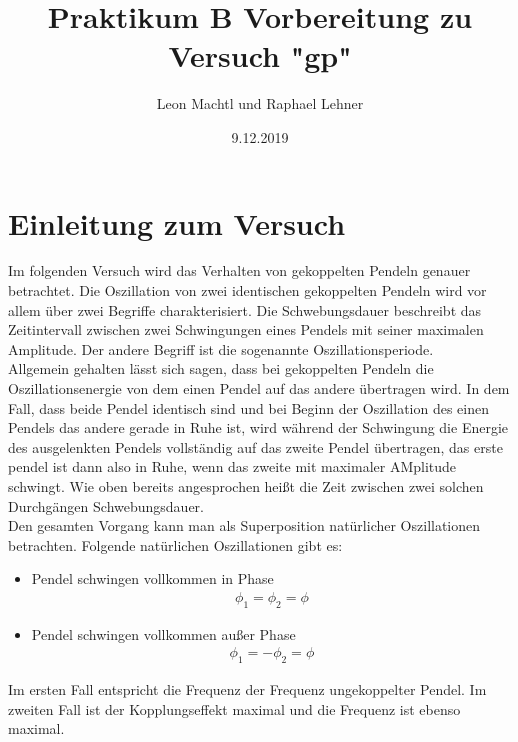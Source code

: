 \documentclass[a4paper,10pt]{scrartcl}
\title{Praktikum B Vorbereitung zu Versuch "gp"}
\author{Leon Machtl und Raphael Lehner}
\date{9.12.2019}
\begin{document}
	\maketitle
	\tableofcontents
	\newpage
	
	\section{Einleitung zum Versuch}
		Im folgenden Versuch wird das Verhalten von gekoppelten Pendeln genauer betrachtet. Die Oszillation von zwei identischen gekoppelten Pendeln wird vor allem über zwei Begriffe charakterisiert. Die Schwebungsdauer beschreibt das Zeitintervall zwischen zwei Schwingungen eines Pendels mit seiner maximalen Amplitude. Der andere Begriff ist die sogenannte Oszillationsperiode.\\
		Allgemein gehalten lässt sich sagen, dass bei gekoppelten Pendeln die Oszillationsenergie von dem einen Pendel auf das andere übertragen wird. In dem Fall, dass beide Pendel identisch sind und bei Beginn der Oszillation des einen Pendels das andere gerade in Ruhe ist, wird während der Schwingung die Energie des ausgelenkten Pendels vollständig auf das zweite Pendel übertragen, das erste pendel ist dann also in Ruhe, wenn das zweite mit maximaler AMplitude schwingt. Wie oben bereits angesprochen heißt die Zeit zwischen zwei solchen Durchgängen Schwebungsdauer.\\
		Den gesamten Vorgang kann man als Superposition natürlicher Oszillationen betrachten. Folgende natürlichen Oszillationen gibt es:
		\begin{itemize}
			\item Pendel schwingen vollkommen in Phase
				\begin{align*}
				\phi_{1}=\phi_{2}=\phi
				\end{align*}
			\item Pendel schwingen vollkommen außer Phase
				\begin{align*}
				\phi_{1}=-\phi_{2}=\phi
				\end{align*}
		\end{itemize}
		Im ersten Fall entspricht die Frequenz der Frequenz ungekoppelter Pendel. Im zweiten Fall ist der Kopplungseffekt maximal und die Frequenz ist ebenso maximal.
		
\end{document}
